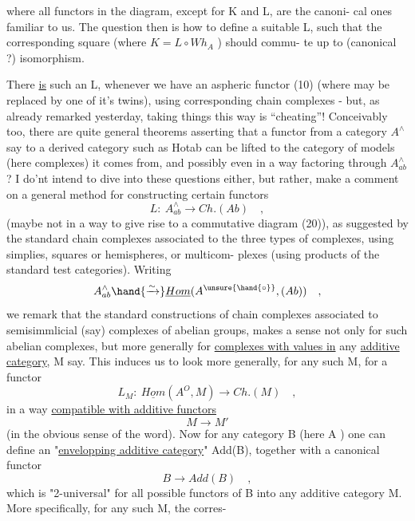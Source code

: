 
where all functors in the diagram,  except for K and L,  are the canoni-%
cal ones familiar to us.  The question then is how to define a suitable
L,  such that the corresponding square (where  $K = L\circ Wh_{A}$ ) should commu-%
te up to (canonical ?) isomorphism.

There \uline{is} such an L,  whenever we have an  aspheric functor (10)
(where \hand{$\Delta$} may be replaced by one of it's twins),  using corresponding
 chain complexes  -  but, as already remarked yesterday,
taking things this way is ``cheating''!  Conceivably too,  there are quite
general theorems asserting that a functor from a category $A^{\wedge}$ say to
a derived  category such as Hotab  can be lifted to the category
of models (here  complexes)  it comes from,  and possibly even in a
way factoring through $A^{\wedge}_{ab}$ ?   I do'nt intend to dive into these questions
either,  but rather,  make a comment on a general method for constructing
certain functors
 \[ L:\ A^{\wedge}_{ab} \longrightarrow Ch.(Ab) \quad , \]
(maybe not in a way to give rise to a commutative diagram (20)),  as
suggested by the standard chain complexes associated to the three types
of complexes,  using simplies,  squares or hemispheres,  or multicom-%
plexes (using products of the standard test categories).  Writing
\[ A^{\wedge}_{ab} \hand{\xrightarrow{\sim}} \underline{Hom}(A^{\unsure{\hand{\circ}}}, (Ab)) \quad , \]
we remark that the standard constructions of chain complexes associated
to semisimmlicial (say) complexes of abelian groups,  makes a sense not
only for such abelian complexes,  but more generally for \uline{complexes with
values in} any \uline{additive category},  M say.   This induces us to look
more generally,  for any such M,  for a functor
 \[ L_{M} :\ \underline{Hom}(A^{O}, M) \longrightarrow Ch.(M) \quad , \]
in a way \uline{compatible with additive functors}
\[ M \to M' \]
(in the obvious sense of the word).\hand{//} Now for any category B (here A )
one can define an "\uline{envelopping additive category}"  Add(B),  together
with a canonical functor
 \[ B \longrightarrow Add(B) \quad , \]
which  is "2-universal"  for all possible functors of B into any
additive category M.  More specifically,  for any such M,  the corres-%

